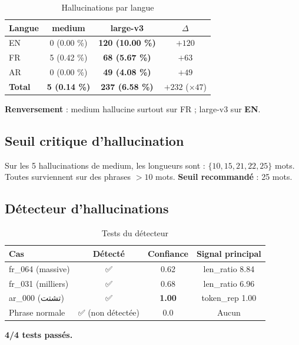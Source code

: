 \documentclass[11pt,a4paper]{article}
\begin{document}
\begin{table}[h]
\centering
\caption{Hallucinations par langue}
\label{tab:hallucinations}
\begin{tabular}{lccc}
\toprule
\textbf{Langue} & \textbf{medium} & \textbf{large-v3} & \textbf{$\Delta$} \\
\midrule
EN & 0 (0.00 \%) & \textbf{120 (10.00 \%)} & $+120$ \\
FR & 5 (0.42 \%) & \textbf{68 (5.67 \%)} & $+63$ \\
AR & 0 (0.00 \%) & \textbf{49 (4.08 \%)} & $+49$ \\
\midrule
\textbf{Total} & \textbf{5 (0.14 \%)} & \textbf{237 (6.58 \%)} & $+232$ ($\times 47$) \\
\bottomrule
\end{tabular}
\end{table}

\textbf{Renversement} : medium hallucine surtout sur FR ; large-v3 sur
\textbf{EN}.

\subsection{Seuil critique d'hallucination}

Sur les 5 hallucinations de medium, les longueurs sont :
$\{10, 15, 21, 22, 25\}$ mots. Toutes surviennent sur des phrases
$> 10$ mots. \textbf{Seuil recommandé} : 25 mots.

\subsection{Détecteur d'hallucinations}

\begin{table}[h]
\centering
\caption{Tests du détecteur}
\label{tab:detector}
\begin{tabular}{lccc}
\toprule
\textbf{Cas} & \textbf{Détecté} & \textbf{Confiance} & \textbf{Signal principal} \\
\midrule
fr\_064 (massive) & ✅ & 0.62 & len\_ratio 8.84 \\
fr\_031 (milliers) & ✅ & 0.68 & len\_ratio 6.96 \\
ar\_000 (تشتت)    & ✅ & \textbf{1.00} & token\_rep 1.00 \\
Phrase normale    & ✅ (non détectée) & 0.0 & Aucun \\
\bottomrule
\end{tabular}
\end{table}

\textbf{4/4 tests passés.}
\end{document}

